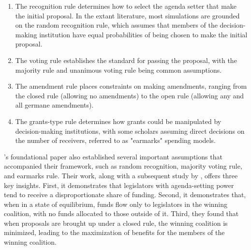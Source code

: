 \begin{enumerate}
    \item The recognition rule determines how to select the agenda setter that make the initial proposal. In the extant literature, most simulations are grounded on the random recognition rule, which assumes that members of the decision-making institution have equal probabilities of being chosen to make the initial proposal\parencite{anesi2015bargaining, diermeier2011legislative,kalandrakis2004three,rosenstiel2021congressional}.
    \item The voting rule establishes the standard for passing the proposal, with the majority rule and unanimous voting rule being common assumptions\parencite{baron1989bargaining}.
    \item The amendment rule places constraints on making amendments, ranging from the closed rule (allowing no amendments) to the open rule (allowing any and all germane amendments).
    \item The grants-type rule determines how grants could be manipulated by decision-making institutions, with some scholars assuming direct decisions on the number of receivers, referred to as "earmarks" spending models.
\end{enumerate}

\textcite{baron1989bargaining}'s foundational paper also established several important assumptions that accompanied their framework, such as random recognition, majority voting rule, and earmarks rule. Their work, along with a subsequent study by \textcite{banks2006general}, offers three key insights. First, it demonstrates that legislators with agenda-setting power tend to receive a disproportionate share of funding. Second, it demonstrates that, when in a state of equilibrium, funds flow only to legislators in the winning coalition, with no funds allocated to those outside of it. Third, they found that when proposals are brought up under a closed rule, the winning coalition is minimized, leading to the maximization of benefits for the members of the winning coalition.

